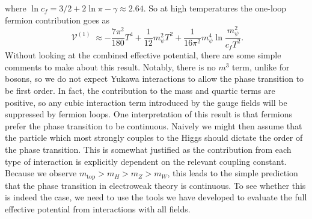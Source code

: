 \documentclass[%
 reprint,
nofootinbib,
 amsmath,amssymb,
 aps,
floatfix,
]{revtex4-1}
\DeclareMathOperator{\V}{\mathcal{V}}
\begin{document}
where $\ln c_f=3/2 + 2\ln \pi - \gamma \approx 2.64$.
So at high temperatures the one-loop fermion contribution goes as
\begin{equation}
    \V^{(1)} \approx -\frac{7\pi^2}{180}T^4 + \frac{1}{12}m_\psi^2 T^2 + \frac{1}{16\pi^2}m_\psi^4\ln\frac{m_\psi^2}{c_f T^2}.
\end{equation}
Without looking at the combined effective potential, there are some simple comments to make about this result.
Notably, there is no $m^3$ term, unlike for bosons, so we do not expect Yukawa interactions to allow the phase transition to be first order.
In fact, the contribution to the mass and quartic terms are positive, so any cubic interaction term introduced by the gauge fields will be suppressed by fermion loops.
One interpretation of this result is that fermions prefer the phase transition to be continuous.
Naively we might then assume that the particle which most strongly couples to the Higgs should dictate the order of the phase transition.
This is somewhat justified as the contribution from each type of interaction is explicitly dependent on the relevant coupling constant.
Because we observe $m_\text{top} > m_H > m_Z > m_W$, this leads to the simple prediction that the phase transition in electroweak theory is continuous.
To see whether this is indeed the case, we need to use the tools we have developed to evaluate the full effective potential from interactions with all fields.
\end{document}
